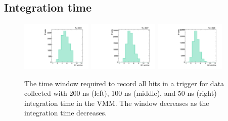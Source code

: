 \subsection{Integration time}
\label{sec:perf-integ}

\begin{figure}[!htpb]
  \begin{center}
    \includegraphics[width=0.3\textwidth]{figures/gbtanalysis3530/artwin_lin.pdf}
    \includegraphics[width=0.3\textwidth]{figures/gbtanalysis3527/artwin_lin.pdf}
    \includegraphics[width=0.3\textwidth]{figures/gbtanalysis3528/artwin_lin.pdf}
  \end{center}
  \vspace{-10pt}
  \caption{The time window required to record all hits in a trigger for data collected with 200 ns (left), 100 ns (middle), and 50 ns (right) integration time in the VMM. The window decreases as the integration time decreases.}
  \label{fig:integ_window}
\end{figure}

